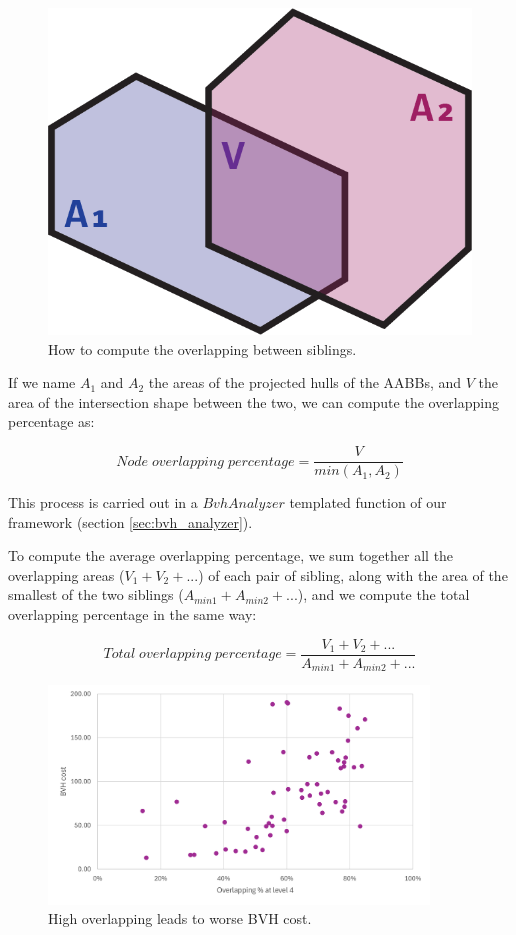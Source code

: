 \documentclass{PoliMi_MasterThesis}
\begin{document}
\begin{figure}[H] 
	\centering
	\includegraphics[width=\textwidth*\real{0.25}]{Images/overlapping.png}
	\caption{How to compute the overlapping between siblings.}
	\label{fig:pah_overlapping_siblings}
\end{figure}

If we name $A_1$ and $A_2$ the areas of the projected hulls of the AABBs, and $V$ the area of the intersection shape between the two, we can compute the overlapping percentage as:

$$Node \; overlapping \; percentage = \frac{V}{min(A_1, A_2)}$$

This process is carried out in a $BvhAnalyzer$ templated function of our framework (section \ref{sec:bvh_analyzer}).

To compute the average overlapping percentage, we sum together all the overlapping areas ($V_1 + V_2 + ...$) of each pair of sibling, along with the area of the smallest of the two siblings ($A_{min1} + A_{min2} + ...$), and we compute the total overlapping percentage in the same way:

$$Total \; overlapping \; percentage = \frac{V_1 + V_2 + ...}{A_{min1} + A_{min2} + ...}$$

\begin{figure}[H] 
	\centering
	\includegraphics[width=0.9\textwidth]{Images/overlapping_quality_scatter.png}
	\caption{High overlapping leads to worse BVH cost.}
	\label{fig:overlapping_scatter}
\end{figure}
\end{document}
